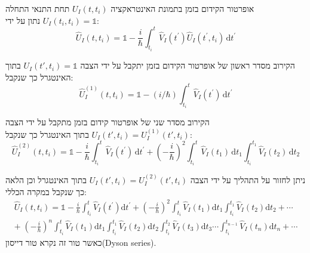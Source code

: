\documentclass{tstextbook}
\begin{document}
\begin{corollary}
אופרטור הקידום בזמן בתמונת האינטראקציה \(U_{I}(t,t_{i})\) תחת התנאי התחלה \(U_{I}(t_{i},t_{i})=\mathbb{1}\) נתון על ידי:
$$\hat{U}_{I}(t,t_{i})=\mathbb{1} -\frac{i}{\hbar}\int_{t_{i}}^{t}\hat{V}_{I}\left( t^{\prime} \right)\hat{U}_{I}\left( t^{\prime},t_{i} \right)\,\mathrm{d}t^{\prime}$$

\end{corollary}
\begin{proposition}
הקירוב מסדר ראשון של אופרטור הקידום בזמן יתקבל על ידי הצבה \(U_{I}(t',t_{i})=\mathbb{1}\) בתוך האינטגרל כך שנקבל:
$$\hat{U}_{I}^{(1)}(t,t_{i})=\mathbb{1} -\left( i/\hbar \right)\int_{t_{i}}^{t}\hat{V}_{I}\left( t^{\prime} \right)\,\mathrm{d}t^{\prime}$$

\end{proposition}
\begin{proposition}
הקירוב מסדר שני של אופרטור קידום בזמן מתקבל על ידי הצבה \(U_{I}(t',t_{i})=U_{I}^{(1)}(t',t_{i})\) בתוך האינטגרל כך שנקבל:
$$\hat{U}_{I}^{(2)}(t,t_{i})=\mathbb{1} -\frac{i}{\hbar}\int_{t_{i}}^{t}\hat{V}_{I}\left( t^{\prime} \right)\,\mathrm{d}t^{\prime}+\left(-\frac{i}{\hbar}\right)^{2}\int_{t_{i}}^{t}\hat{V}_{I}(t_{1})\,\mathrm{d}t_{1}\int_{t_{i}}^{t_{1}}\hat{V}_{I}(t_{2})\,\mathrm{d}t_{2}$$

\end{proposition}
\begin{corollary}
ניתן לחזור על התהליך על ידי הצבה \(U_{I}(t',t_{i})=U_{I}^{(2)}(t',t_{i})\) בתוך האינטגרל וכן הלאה כך שנקבל במקרה הכללי:
\begin{gather*}\hat{U}_{I}(t,t_{i})=\mathbb{1} -\frac{i}{\hbar}\int_{t_{i}}^{t}\hat{V}_{I}\left( t^{\prime} \right)\mathrm{d}t^{\prime}+\left(-\frac{i}{\hbar}\right)^{2}\int_{t_{i}}^{t}\hat{V}_{I}(t_{1})\mathrm{d}t_{1}\int_{t_{i}}^{t_{1}}\hat{V}_{I}(t_{2})\mathrm{d}t_{2}+\cdots \\ +\;\left(-\frac{i}{\hbar}\right)^{n}\!\!\int_{t_{i}}^{t}\hat{V}_{I}(t_{1})\mathrm{d}t_{1}\!\int_{t_{i}}^{t_{1}}\hat{V}_{I}(t_{2})\mathrm{d}t_{2}\!\int_{t_{i}}^{t_{2}}\hat{V}_{I}(t_{3})\mathrm{d}t_{3}\cdots\int_{t_{i}}^{t_{n-1}}\hat{V}_{I}(t_{n})\mathrm{d}t_{n}+\cdots 
\end{gather*}
כאשר טור זה נקרא טור דייסון(Dyson series).

\end{corollary}
\end{document}
